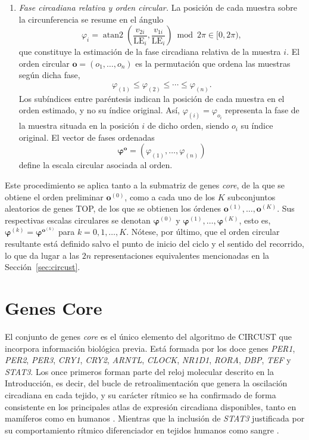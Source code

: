 \documentclass[12pt, a4paper]{report}
\begin{document}
\begin{enumerate}
\item \textit{Fase circadiana relativa y orden circular.} La posición de cada muestra sobre la circunferencia se resume en el ángulo
\[
\varphi_i=\operatorname{atan2}\left(\frac{v_{2i}}{\mathrm{LE}_i},\frac{v_{1i}}{\mathrm{LE}_i}\right)\bmod 2\pi\in[0,2\pi),
\]
que constituye la estimación de la fase circadiana relativa de la muestra \(i\). El orden circular \(\mathbf{o}=(o_1,\ldots,o_n)\) es la permutación que ordena las muestras según dicha fase,
\[\varphi_{(1)} \leq \varphi_{(2)} \leq \cdots \leq \varphi_{(n)}.\]
Los subíndices entre paréntesis indican la posición de cada muestra en el orden estimado, y no su índice original. Así, \(\varphi_{(i)}=\varphi_{o_i}\) representa la fase de la muestra situada en la posición \(i\) de dicho orden, siendo \(o_i\) su índice original. El vector de fases ordenadas
\[\boldsymbol{\varphi}^{\mathbf{o}}=\left(\varphi_{(1)},\ldots,\varphi_{(n)}\right)\]
define la escala circular asociada al orden.

\end{enumerate}

Este procedimiento se aplica tanto a la submatriz de genes \textit{core}, de la que se obtiene el orden preliminar \(\mathbf{o}^{(0)}\), como a cada uno de los \(K\) subconjuntos aleatorios de genes TOP, de los que se obtienen los órdenes \(\mathbf{o}^{(1)},\ldots,\mathbf{o}^{(K)}\). Sus respectivas escalas circulares se denotan \(\boldsymbol{\varphi}^{(0)}\) y \(\boldsymbol{\varphi}^{(1)},\ldots,\boldsymbol{\varphi}^{(K)}\), esto es, \(\boldsymbol{\varphi}^{(k)}=\boldsymbol{\varphi}^{\mathbf{o}^{(k)}}\) para \(k=0,1,\ldots,K\). Nótese, por último, que el orden circular resultante está definido salvo el punto de inicio del ciclo y el sentido del recorrido, lo que da lugar a las \(2n\) representaciones equivalentes mencionadas en la Sección~\ref{sec:circust}.

\section{Genes Core}
\label{sec:GenesCore}

El conjunto de genes \textit{core} es el único elemento del algoritmo de CIRCUST que incorpora información biológica previa. Está formada por los doce genes \textit{PER1}, \textit{PER2}, \textit{PER3}, \textit{CRY1}, \textit{CRY2}, \textit{ARNTL}, \textit{CLOCK}, \textit{NR1D1}, \textit{RORA}, \textit{DBP}, \textit{TEF} y \textit{STAT3}. Los once primeros forman parte del reloj molecular descrito en la Introducción, es decir, del bucle de retroalimentación que genera la oscilación circadiana en cada tejido, y su carácter rítmico se ha confirmado de forma consistente en los principales atlas de expresión circadiana disponibles, tanto en mamíferos \citep{zhang2014, mure2018} como en humanos \citep{ruben2018, wu2018}. Mientras que la inclusión de \textit{STAT3} justificada por su comportamiento rítmico diferenciador en tejidos humanos como sangre \citep{lech2016, bozek2009}.
\end{document}
